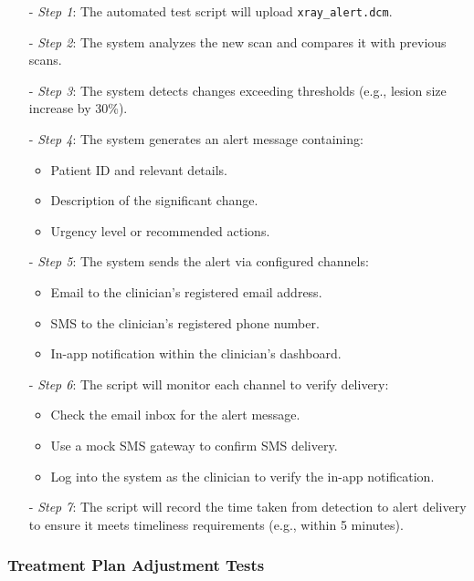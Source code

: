 \documentclass[12pt, titlepage]{article}
\begin{document}
\begin{enumerate}
  \begin{itemize}
  \item[-] \textit{Step 1}: The automated test script will upload \texttt{xray\_alert.dcm}.
  \item[-] \textit{Step 2}: The system analyzes the new scan and compares it with previous scans.
  \item[-] \textit{Step 3}: The system detects changes exceeding thresholds (e.g., lesion size increase by 30\%).
  \item[-] \textit{Step 4}: The system generates an alert message containing:
    \begin{itemize}
      \item Patient ID and relevant details.
      \item Description of the significant change.
      \item Urgency level or recommended actions.
    \end{itemize}
  \item[-] \textit{Step 5}: The system sends the alert via configured channels:
    \begin{itemize}
      \item Email to the clinician's registered email address.
      \item SMS to the clinician's registered phone number.
      \item In-app notification within the clinician's dashboard.
    \end{itemize}
  \item[-] \textit{Step 6}: The script will monitor each channel to verify delivery:
    \begin{itemize}
      \item Check the email inbox for the alert message.
      \item Use a mock SMS gateway to confirm SMS delivery.
      \item Log into the system as the clinician to verify the in-app notification.
    \end{itemize}
  \item[-] \textit{Step 7}: The script will record the time taken from detection to alert delivery to ensure it meets timeliness requirements (e.g., within 5 minutes).
  \end{itemize}
  
  \end{enumerate}  

\subsubsection{Treatment Plan Adjustment Tests}
\end{document}
